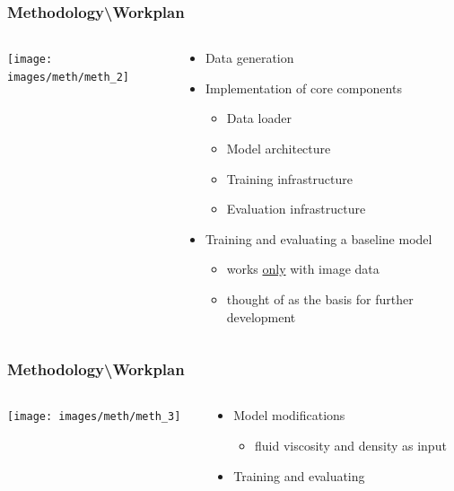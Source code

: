 \documentclass[18pt]{beamer}
\begin{document}
\begin{frame}[t]
  \frametitle{Methodology\textbackslash Workplan}
  \begin{columns}[t]
    \begin{column}{0.35\textwidth}
      \texttt{[image: images/meth/meth\_2]}
    \end{column}
    \begin{column}[t]{0.65\textwidth}
      \vspace*{-5cm}
      \begin{itemize}
      \item Data generation
      \item Implementation of core components
        \begin{itemize}
        \item Data loader
        \item Model architecture
        \item Training infrastructure
        \item Evaluation infrastructure
        \end{itemize}
      \item Training and evaluating a baseline model
        \begin{itemize}
        \item works \underline{only} with image data
        \item thought of as the basis for further development
        \end{itemize}
      \end{itemize}
    \end{column}
  \end{columns}
\end{frame}


\begin{frame}[t]
  \frametitle{Methodology\textbackslash Workplan}
  \begin{columns}[t]
    \begin{column}{0.35\textwidth}
      \texttt{[image: images/meth/meth\_3]}
    \end{column}
    \begin{column}[t]{0.65\textwidth}
      \vspace*{-5cm}
      \begin{itemize}
      \item Model modifications
        \begin{itemize}
        \item fluid viscosity and density as input
        \end{itemize}
      \item Training and evaluating
      \end{itemize}
    \end{column}
  \end{columns}
\end{frame}
\end{document}

